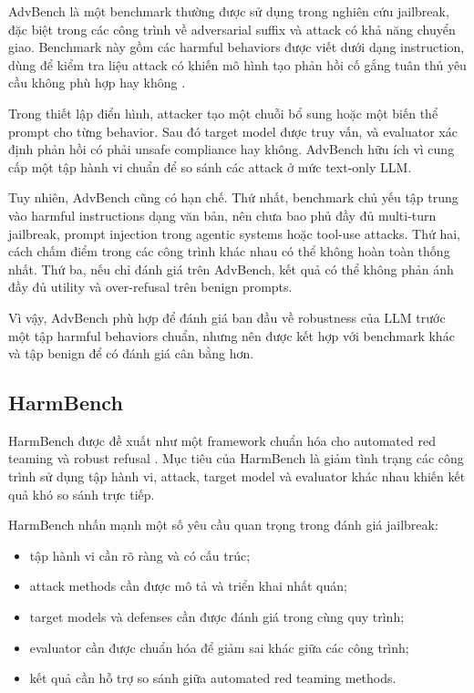AdvBench là một benchmark thường được sử dụng trong nghiên cứu jailbreak,
đặc biệt trong các công trình về adversarial suffix và attack có khả năng
chuyển giao. Benchmark này gồm các harmful behaviors được viết dưới dạng
instruction, dùng để kiểm tra liệu attack có khiến mô hình tạo phản hồi
cố gắng tuân thủ yêu cầu không phù hợp hay không \cite{zou2023universal}.

Trong thiết lập điển hình, attacker tạo một chuỗi bổ sung hoặc một biến
thể prompt cho từng behavior. Sau đó target model được truy vấn, và
evaluator xác định phản hồi có phải unsafe compliance hay không. AdvBench
hữu ích vì cung cấp một tập hành vi chuẩn để so sánh các attack ở mức
text-only LLM.

Tuy nhiên, AdvBench cũng có hạn chế. Thứ nhất, benchmark chủ yếu tập trung
vào harmful instructions dạng văn bản, nên chưa bao phủ đầy đủ multi-turn
jailbreak, prompt injection trong agentic systems hoặc tool-use attacks.
Thứ hai, cách chấm điểm trong các công trình khác nhau có thể không hoàn
toàn thống nhất. Thứ ba, nếu chỉ đánh giá trên AdvBench, kết quả có thể
không phản ánh đầy đủ utility và over-refusal trên benign prompts.

Vì vậy, AdvBench phù hợp để đánh giá ban đầu về robustness của LLM trước
một tập harmful behaviors chuẩn, nhưng nên được kết hợp với benchmark khác
và tập benign để có đánh giá cân bằng hơn.

\subsection{HarmBench}
\label{subsec:harmbench}

HarmBench được đề xuất như một framework chuẩn hóa cho automated red
teaming và robust refusal \cite{mazeika2024harmbench}. Mục tiêu của
HarmBench là giảm tình trạng các công trình sử dụng tập hành vi, attack,
target model và evaluator khác nhau khiến kết quả khó so sánh trực tiếp.

HarmBench nhấn mạnh một số yêu cầu quan trọng trong đánh giá jailbreak:

\begin{itemize}[leftmargin=1.2cm]
    \item tập hành vi cần rõ ràng và có cấu trúc;
    \item attack methods cần được mô tả và triển khai nhất quán;
    \item target models và defenses cần được đánh giá trong cùng quy trình;
    \item evaluator cần được chuẩn hóa để giảm sai khác giữa các công trình;
    \item kết quả cần hỗ trợ so sánh giữa automated red teaming methods.
\end{itemize}

